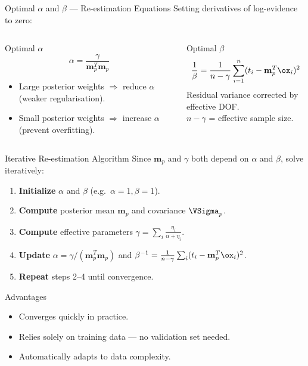 \begin{frame}{Optimal $\alpha$ and $\beta$ — Re-estimation Equations}
  Setting derivatives of log-evidence to zero:
  \vspace{.2em}
  \begin{columns}[T]
  \begin{block}{Optimal $\alpha$}
    \[
      \alpha = \frac{\gamma}{\mathbf{m}_p^T\mathbf{m}_p}
    \]
    \begin{itemize}
      \item Large posterior weights $\Rightarrow$ reduce $\alpha$ (weaker regularisation).
      \item Small posterior weights $\Rightarrow$ increase $\alpha$ (prevent overfitting).
    \end{itemize}
  \end{block}
  \begin{block}{Optimal $\beta$}
    \[
      \frac{1}{\beta} = \frac{1}{n-\gamma}\sum_{i=1}^n(t_i-\mathbf{m}_p^T\ox_i)^2
    \]
    Residual variance corrected by effective DOF.\\
    $n-\gamma$ = effective sample size.
  \end{block}
  \end{columns}
\end{frame}

\begin{frame}{Iterative Re-estimation Algorithm}
  Since $\mathbf{m}_p$ and $\gamma$ both depend on $\alpha$ and $\beta$, solve iteratively:
  \vspace{.3em}
  \begin{enumerate}
    \item \textbf{Initialize} $\alpha$ and $\beta$ (e.g.\ $\alpha=1, \beta=1$).
    \item \textbf{Compute} posterior mean $\mathbf{m}_p$ and covariance $\VSigma_p$.
    \item \textbf{Compute} effective parameters $\gamma = \sum_i \tfrac{\eta_i}{\alpha+\eta_i}$.
    \item \textbf{Update} $\alpha = \gamma/(\mathbf{m}_p^T\mathbf{m}_p)$ and $\beta^{-1} = \tfrac{1}{n-\gamma}\sum_i(t_i-\mathbf{m}_p^T\ox_i)^2$.
    \item \textbf{Repeat} steps 2–4 until convergence.
  \end{enumerate}
  \vspace{.4em}
  \begin{exampleblock}{Advantages}
    \begin{itemize}
      \item Converges quickly in practice.
      \item Relies solely on training data — \alert{no validation set needed}.
      \item Automatically adapts to data complexity.
    \end{itemize}
  \end{exampleblock}
\end{frame}

